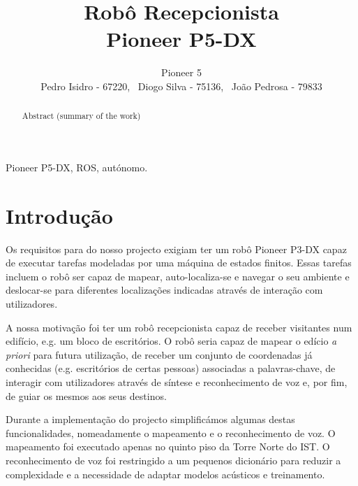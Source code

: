 \documentclass[journal]{IEEEtran}
\begin{document}
\title{Robô Recepcionista \\
	Pioneer P5-DX}

\author{\large Pioneer 5 \normalsize \\
Pedro Isidro - 67220,
~Diogo Silva - 75136,
~João Pedrosa - 79833}


\maketitle

\begin{abstract}
Abstract (summary of the work)
\end{abstract}

\begin{IEEEkeywords}
Pioneer P5-DX, ROS, autónomo.
\end{IEEEkeywords}

\section{Introdução}

Os requisitos para do nosso projecto exigiam ter um robô Pioneer P3-DX capaz de executar tarefas modeladas por uma máquina de estados finitos. Essas tarefas incluem o robô ser capaz de mapear, auto-localiza-se e navegar o seu ambiente e deslocar-se para diferentes localizações indicadas através de interação com utilizadores.

A nossa motivação foi ter um robô recepcionista capaz de receber visitantes num edifício, e.g. um bloco de escritórios. O robô seria capaz de mapear o edício \emph{a priori} para futura utilização, de receber um conjunto de coordenadas já conhecidas (e.g. escritórios de certas pessoas) associadas a palavras-chave, de interagir com utilizadores através de síntese e reconhecimento de voz e, por fim, de guiar os mesmos aos seus destinos.

Durante a implementação do projecto simplificámos algumas destas funcionalidades, nomeadamente o mapeamento e o reconhecimento de voz. O mapeamento foi executado apenas no quinto piso da Torre Norte do IST. O reconhecimento de voz foi restringido a um pequenos dicionário para reduzir a complexidade e a necessidade de adaptar modelos acústicos e treinamento.
\end{document}
